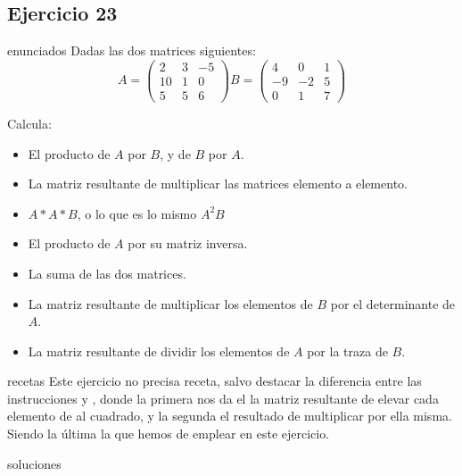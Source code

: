 \subsection{Ejercicio 23}
\def\parte{enunciados}
\ifx\capitulo\parte
Dadas las dos matrices siguientes:
\[
  A = \begin{pmatrix}
    2&3&-5\\
    10&1&0\\
    5&5&6
  \end{pmatrix}
  B = \begin{pmatrix}
    4&0&1\\
    -9&-2&5\\
    0&1&7
  \end{pmatrix}
\]

Calcula:
\begin{itemize}
\item El producto de $A$ por $B$, y de $B$ por $A$.
\item La matriz resultante de multiplicar las matrices elemento a elemento.
\item $A*A*B$, o lo que es lo mismo $A^2B$
\item El producto de $A$ por su matriz inversa.
\item La suma de las dos matrices.
\item La matriz resultante de multiplicar los elementos de $B$ por el determinante de $A$.
\item La matriz resultante de dividir los elementos de $A$ por la traza de $B$.
\end{itemize}
\fi

\def\parte{recetas}
\ifx\capitulo\parte
Este ejercicio no precisa receta, salvo destacar la diferencia entre las instrucciones  y , donde la primera nos da el la matriz resultante de elevar cada elemento de  al cuadrado, y la segunda el resultado de multiplicar  por ella misma. Siendo la última la que hemos de emplear en este ejercicio.
\fi

\def\parte{soluciones}
\ifx\capitulo\parte

\fi
